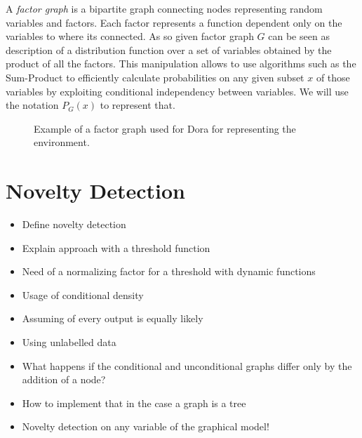 \documentclass[runningheads,a4paper]{llncs}
\begin{document}
A \emph{factor graph} is a bipartite graph connecting nodes representing random variables and factors.
Each factor represents a function dependent only on the variables to where its connected.
As so given factor graph $G$ can be seen as description of a distribution function over a set of variables obtained by
the product of all the factors. This manipulation allows to use algorithms such as the Sum-Product to efficiently calculate
probabilities on any given subset $x$ of those variables by exploiting conditional independency between variables.
We will use the notation $P_G(x)$ to represent that.

\begin{figure}[h]
\centering
{}
\caption{Example of a factor graph used for Dora for representing the environment.}
\end{figure}

\section{Novelty Detection}
\begin{itemize}
\item Define novelty detection 
\item Explain approach with a threshold function
\item Need of a normalizing factor for a threshold with dynamic functions
\item Usage of conditional density
\item Assuming of every output is equally likely
\item Using unlabelled data
\item What happens if the conditional and unconditional graphs differ only by the addition of a node?
\item How to implement that in the case a graph is a tree
\item Novelty detection on any variable of the graphical model!
\end{itemize}
\end{document}
